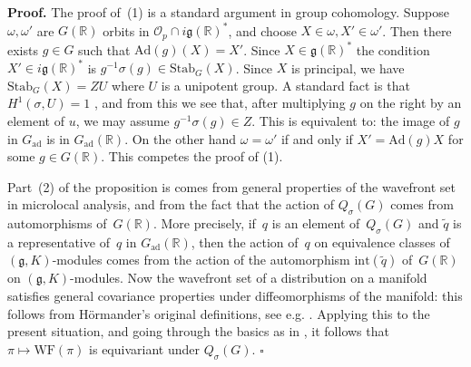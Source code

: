 \documentclass[10pt,leqno]{article}
\numberwithin{equation}{section}
\newcommand{\qed}{\hfill $\square$ \medskip}
\newenvironment{proof}[1][Proof]{\noindent\textbf{#1.} }{\qed}
\newcommand{\Ad}{\mathrm{Ad}}
\newcommand{\Gad}{G_\mathrm{ad}}
\newcommand{\Stab}{\mathrm{Stab}}
\renewcommand{\O}{\mathcal O}
\newcommand{\R}{\mathbb R}
\newcommand{\g}{\mathfrak g}
\newcommand\inv{^{-1}}
\newcommand{\WF}{\mathrm{WF}}
\newcommand{\Op}{\O_p}
\begin{document}
\begin{proof}
The proof of~(1) is a standard argument in group cohomology. Suppose $\omega,\omega'$ are $G(\R)$ orbits in $\Op\cap i\g(\R)^*$,
and choose $X\in \omega,X'\in\omega'$. Then there exists $g\in G$ such that $\Ad(g)(X)=X'$. Since $X\in \g(\R)^*$ the condition $X'\in i\g(\R)^*$ 
is $g\inv \sigma(g)\in \Stab_G(X)$.  Since $X$ is principal, we have $\Stab_G(X)=ZU$ where $U$ is a unipotent group. 
A standard fact is that $H^1(\sigma, U)=1$ \cite[Chap.~III, Proposition~6]{Serre_Galois}, and from this we see that, after multiplying $g$ on the right by an element of $u$, we may assume $g\inv \sigma(g)\in Z$. This is equivalent to: the image of $g$ in $\Gad$ is in $\Gad(\R)$. On the other hand $\omega=\omega'$ 
if and only if $X'=\Ad(g)X$ for some $g\in G(\R)$. This competes the proof of (1).

Part~(2) of the proposition is comes from general properties of the wavefront set in microlocal analysis, and from the fact that the action of $Q_{\sigma}(G)$ comes from automorphisms of~$G(\R)$. More precisely, if~$q$ is an element of~$Q_{\sigma}(G)$ and $\tilde{q}$ is a representative of~$q$ in $\Gad(\R)$, then the action of~$q$ on equivalence classes of $(\g, K)$-modules comes from the action of the automorphism $\mathrm{int}(\tilde{q})$ of~$G(\R)$ on $(\g, K)$-modules. Now the wavefront set of a distribution on a manifold satisfies general covariance properties under diffeomorphisms of the manifold: this follows from Hörmander's original definitions, see e.g. \cite[Section 2, p.~800]{HarrisHeOlafsson}. Applying this to the present situation, and going through the basics as in   \cite[Section~2]{HarrisHeOlafsson}, it follows that $\pi \mapsto \WF(\pi)$ is equivariant under $Q_{\sigma}(G)$.
\end{proof}
\end{document}
